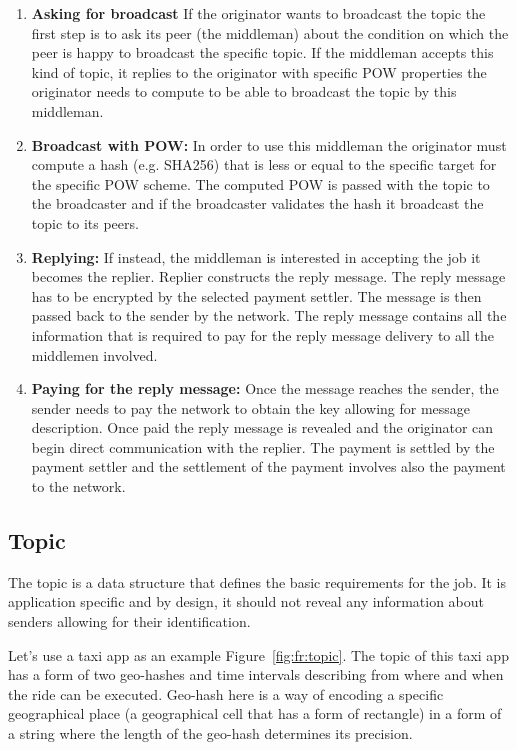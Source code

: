\documentclass{article}
\begin{document}
\begin{enumerate} 
	\item  \textbf{Asking for broadcast} If the originator wants to broadcast the topic the first step is to ask its peer (the middleman) about the condition on which the peer is happy to broadcast the specific topic. If the middleman accepts this kind of topic, it replies to the originator with specific POW properties the originator needs to compute to be able to broadcast the topic by this middleman.
	\item  \textbf{Broadcast with POW:} In order to use this middleman the originator must compute a hash (e.g. SHA256) that is less or equal to the specific target for the specific POW scheme. The computed POW is passed with the topic to the broadcaster and if the broadcaster validates the hash it broadcast the topic to its peers.
	\item  \textbf{Replying:} If instead, the middleman is interested in accepting the job it becomes the replier. Replier constructs the reply message. The reply message has to be encrypted by the selected payment settler. The message is then passed back to the sender by the network. The reply message contains all the information that is required to pay for the reply message delivery to all the middlemen involved. 
	\item  \textbf{Paying for the reply message:} Once the message reaches the sender, the sender needs to pay the network to obtain the key allowing for message description. Once paid the reply message is revealed and the originator can begin direct communication with the replier. The payment is settled by the payment settler and the settlement of the payment involves also the payment to the network.
\end{enumerate}

\subsection{Topic}

The topic is a data structure that defines the basic requirements for the job. It is application specific and by design, it should not reveal any information about senders allowing for their identification.

Let's use a taxi app as an example {Figure~\ref{fig:fr:topic}}. The topic of this taxi app has a form of two geo-hashes and time intervals describing from where and when the ride can be executed. Geo-hash here is a way of encoding a specific geographical place (a geographical cell that has a form of rectangle) in a form of a string where the length of the geo-hash determines its precision.
\end{document}
